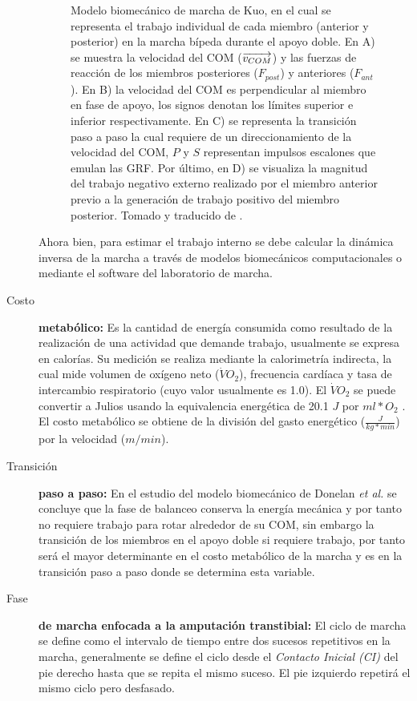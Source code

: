 \documentclass[12pt,english]{article}
\begin{document}
\begin{description}
\begin{figure}
\caption{\label{fig:Modelo-biomec=0000E1nico-de}Modelo biomecánico de marcha
de Kuo, en el cual se representa el trabajo individual de cada miembro
(anterior y posterior) en la marcha bípeda durante el apoyo doble.
En A) se muestra la velocidad del COM ($\protect\overrightarrow{v_{COM}}$)
y las fuerzas de reacción de los miembros posteriores ($F_{post}$)
y anteriores ($F_{ant}$). En B) la velocidad del COM es perpendicular
al miembro en fase de apoyo, los signos denotan los límites superior
e inferior respectivamente. En C) se representa la transición paso
a paso la cual requiere de un direccionamiento de la velocidad del
COM, $P$ y $S$ representan impulsos escalones que emulan las GRF.
Por último, en D) se visualiza la magnitud del trabajo negativo externo
realizado por el miembro anterior previo a la generación de trabajo
positivo del miembro posterior. Tomado y traducido de \cite{Donelan2002}.}
\end{figure}



Ahora bien, para estimar el trabajo interno se debe calcular la dinámica
inversa de la marcha a través de modelos biomecánicos computacionales
o mediante el software del laboratorio de marcha.

\item [{Costo}] \textbf{metabólico:} Es la cantidad de energía consumida
como resultado de la realización de una actividad que demande trabajo,
usualmente se expresa en calorías. Su medición se realiza mediante
la calorimetría indirecta, la cual mide volumen de oxígeno neto ($\dot{V}O_{2}$),
frecuencia cardíaca y tasa de intercambio respiratorio (cuyo valor
usualmente es 1.0). El $\dot{V}O_{2}$ se puede convertir a Julios
usando la equivalencia energética de 20.1 $J$ por $ml*O_{2}$ \cite{Mian2006}.
El costo metabólico se obtiene de la división del gasto energético
($\frac{J}{kg*min}$) por la velocidad ($m/min$).
\item [{Transición}] \textbf{paso a paso: }En el estudio del modelo biomecánico
de Donelan \emph{et al.} \cite{Donelan2002a} se concluye que la fase
de balanceo conserva la energía mecánica y por tanto no requiere trabajo
para rotar alrededor de su COM, sin embargo la transición de los miembros
en el apoyo doble si requiere trabajo, por tanto será el mayor determinante
en el costo metabólico de la marcha y es en la transición paso a paso
donde se determina esta variable.
\item [{Fase}] \textbf{de marcha enfocada a la amputación transtibial:}
El ciclo de marcha se define como el intervalo de tiempo entre dos
sucesos repetitivos en la marcha, generalmente se define el ciclo
desde el \emph{Contacto Inicial (CI)}
del pie derecho hasta que se repita el mismo suceso. El pie izquierdo
repetirá el mismo ciclo pero desfasado.




\end{description}
\end{document}
